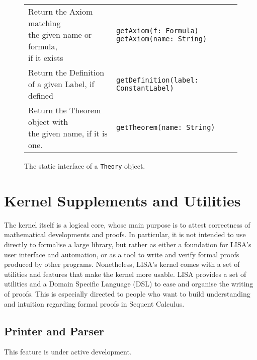 {\begin{figure}[hp]
\begin{center}
\begin{tabular}{l|l}
          \makecell[l]{Return the Axiom matching        \\ the given name or formula,\\ if it exists} &
          \begin{lstlisting}
getAxiom(f: Formula)
getAxiom(name: String)
\end{lstlisting}
          \\ %
          \makecell[l]{Return the Definition            \\of a given Label, if defined} &
          \begin{lstlisting}
getDefinition(label: ConstantLabel)
\end{lstlisting}
          \\ %

          \makecell[l]{Return the Theorem object with   \\the given name, if it is one.} &
          \begin{lstlisting}
getTheorem(name: String)
\end{lstlisting}
          \\ %
        \end{tabular}
        \caption{The static interface of a \lstinline{Theory}{} object.}
        \label{fig:theorygetters}
      \end{center}
    \end{figure}
  }
\newpage
\section{Kernel Supplements and Utilities}
\label{sect:kernelsuppl}
The kernel itself is a logical core, whose main purpose is to attest correctness of mathematical developments and proofs. In particular, it is not intended to use directly to formalise a large library, but rather as either a foundation for LISA's user interface and automation, or as a tool to write and verify formal proofs produced by other programs.
Nonetheless, LISA's kernel comes with a set of utilities and features that make the kernel more usable.
LISA provides a set of utilities and a Domain Specific Language (DSL) to ease and organise the writing of proofs. This is especially directed to people who want to build understanding and intuition regarding formal proofs in Sequent Calculus.

\subsection{Printer and Parser}
This feature is under active development.

